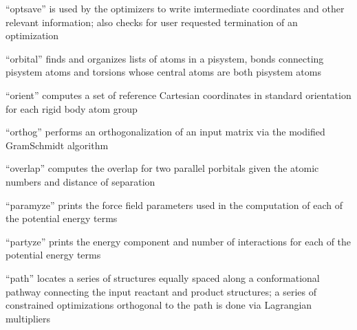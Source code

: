 \documentclass[letterpaper,11pt,english]{sphinxmanual}
\begin{document}

“optsave” is used by the optimizers to write imtermediate
coordinates and other relevant information; also checks for
user requested termination of an optimization


“orbital” finds and organizes lists of atoms in a pisystem,
bonds connecting pisystem atoms and torsions whose central
atoms are both pisystem atoms


“orient” computes a set of reference Cartesian coordinates
in standard orientation for each rigid body atom group


“orthog” performs an orthogonalization of an input matrix
via the modified Gram\sphinxhyphen{}Schmidt algorithm


“overlap” computes the overlap for two parallel p\sphinxhyphen{}orbitals
given the atomic numbers and distance of separation


“paramyze” prints the force field parameters used in the
computation of each of the potential energy terms


“partyze” prints the energy component and number of
interactions for each of the potential energy terms












“path” locates a series of structures equally spaced along
a conformational pathway connecting the input reactant and
product structures; a series of constrained optimizations
orthogonal to the path is done via Lagrangian multipliers
\end{document}

